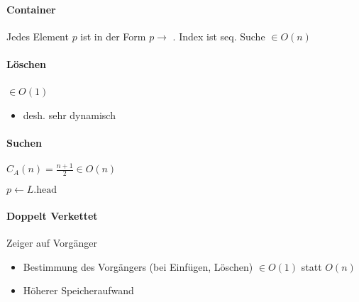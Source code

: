 \paragraph{Container} Jedes Element $p$ ist in der Form $p \rightarrow$ . Index ist seq. Suche $\in O(n)$

\paragraph{Löschen} $\in O(1)$\

\begin{algorithm}[H]


\end{algorithm}

\begin{itemize}
  \item desh. sehr dynamisch
\end{itemize}

\paragraph{Suchen} $C_A(n) = \frac{n + 1}{2} \in O(n)$

\begin{algorithm}[H]


  $p \leftarrow L.\text{head}$

\end{algorithm}


\paragraph{Doppelt Verkettet}
Zeiger auf Vorgänger 

\begin{itemize}
  \item Bestimmung des Vorgängers (bei Einfügen, Löschen)
        $\in O(1)$ statt $O(n)$

  \item Höherer Speicheraufwand
\end{itemize}

